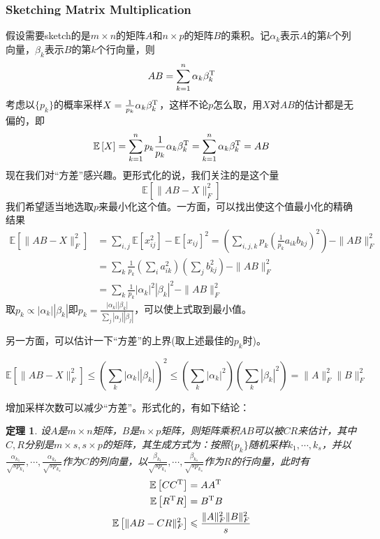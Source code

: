 \documentclass[8pt]{article}
\theoremstyle{compact}
\newtheorem{theorem}{定理}
\def\le{\leqslant}
\def\E#1{\mathbb{E}\left[{#1}\right]}
\begin{document}
\subsubsection{Sketching Matrix Multiplication}
假设需要sketch的是$m \times n$的矩阵$A$和$n \times p$的矩阵$B$的乘积。记$\alpha_k$表示$A$的第$k$个列向量，$\beta_k$表示$B$的第$k$个行向量，则\begin{equation}
AB = \sum_{k=1}^{n}\alpha_k\beta_k^{\text T}
\end{equation}
考虑以$\{p_k\}$的概率采样$X = \frac{1}{p_k}\alpha_k\beta_k^{\text T}$，这样不论$p$怎么取，用$X$对$AB$的估计都是无偏的，即
\begin{equation}
\E{X} = \sum_{k=1}^{n}p_k\frac{1}{p_k}\alpha_k\beta_k^{\text T} = \sum_{k=1}^{n}\alpha_k\beta_k^{\text T} = AB
\end{equation}
现在我们对“方差”感兴趣。更形式化的说，我们关注的是这个量
\begin{equation}
\E{\|AB - X\|_F^2}
\end{equation}
我们希望适当地选取$p$来最小化这个值。一方面，可以找出使这个值最小化的精确结果
\begin{equation}
\begin{split}
\E{\|AB - X\|_F^2} &= \sum_{i,j}\E{x_{ij}^2} - \E{x_{ij}}^2 = \left(\sum_{i,j,k}p_k\left(\frac{1}{p_k}a_{ik}b_{kj}\right)^2\right) - \|AB\|_F^2\\
&= \sum_k\frac{1}{p_k}\left(\sum_i a_{ik}^2\right)\left(\sum_j b_{kj}^2\right) - \|AB\|_F^2\\&= \sum_{k}\frac{1}{p_k}|\alpha_k|^2|\beta_k|^2- \|AB\|_F^2
\end{split}
\end{equation}
取$p_k \propto |\alpha_k||\beta_k|$即$p_k = \frac{|\alpha_k||\beta_k|}{\sum_j |\alpha_j||\beta_j|}$，可以使上式取到最小值。

另一方面，可以估计一下“方差”的上界(取上述最佳的$p_k$时)。

\begin{equation}
\E{\|AB - X\|_F^2} \le \left(\sum_k |\alpha_k||\beta_k|\right)^2 \le \left(\sum_k|\alpha_k|^2\right)\left(\sum_k|\beta_k|^2\right) = \|A\|_F^2 \|B\|_F^2
\end{equation}

增加采样次数可以减少“方差”。形式化的，有如下结论：
\begin{theorem}
	设$A$是$m \times n$矩阵，$B$是$n \times p$矩阵，则矩阵乘积$AB$可以被$CR$来估计，其中$C, R$分别是$m \times s, s \times p$的矩阵，其生成方式为：按照$\{p_k\}$随机采样$k_1, \cdots, k_s$，并以$\frac{\alpha_{k_1}}{\sqrt{sp_{k_1}}},\cdots, \frac{\alpha_{k_s}}{\sqrt{sp_{k_s}}}$作为$C$的列向量，以$\frac{\beta_{k_1}}{\sqrt{sp_{k_1}}},\cdots, \frac{\beta_{k_s}}{\sqrt{sp_{k_s}}}$作为$R$的行向量，此时有
\begin{equation}
\begin{split}
\E{CC^{\text T}} &= AA^\text T\\
\E{R^{\text T}R} &= B^\text TB\\
\E{\|AB - CR\|_F^2} &\le \frac{\|A\|_F^2\|B\|_F^2}{s}
\end{split}
\end{equation}
\end{theorem}
\end{document}
